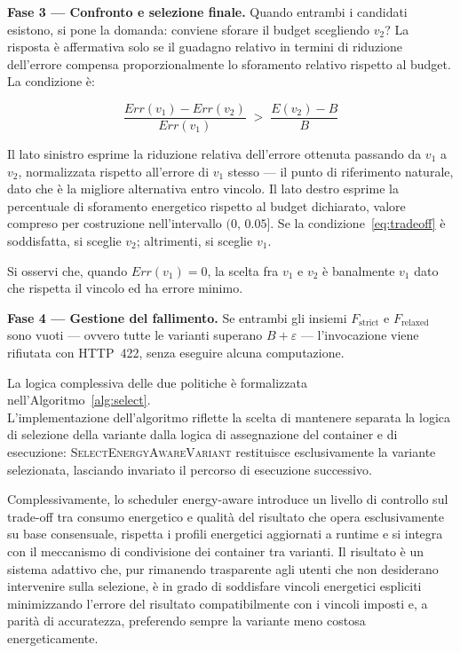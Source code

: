 \medskip
\noindent\textbf{Fase 3 — Confronto e selezione finale.}
Quando entrambi i candidati esistono, si pone la domanda: conviene
sforare il budget scegliendo $v_2$? La risposta è affermativa solo se il
guadagno relativo in termini di riduzione dell'errore compensa proporzionalmente
lo sforamento relativo rispetto al budget. La condizione è:

\begin{equation}
  \frac{\mathit{Err}(v_1) - \mathit{Err}(v_2)}{\mathit{Err}(v_1)}
  \;>\;
  \frac{E(v_2) - B}{B}
  \label{eq:tradeoff}
\end{equation}

Il lato sinistro esprime la riduzione relativa dell'errore ottenuta
passando da $v_1$ a $v_2$, normalizzata rispetto all'errore di $v_1$
stesso — il punto di riferimento naturale, dato che è la migliore
alternativa entro vincolo. Il lato destro esprime la percentuale di
sforamento energetico rispetto al budget dichiarato, valore compreso per
costruzione nell'intervallo $(0,\, 0.05]$.
Se la condizione~\eqref{eq:tradeoff} è soddisfatta, si sceglie $v_2$; altrimenti,
 si sceglie $v_1$.

Si osservi che, quando $\mathit{Err}(v_1) = 0$, la scelta fra $v_1$ e $v_2$ è banalmente $v_1$
dato che rispetta il vincolo ed ha errore minimo.

\medskip
\noindent\textbf{Fase 4 — Gestione del fallimento.}
Se entrambi gli insiemi $F_{\text{strict}}$ e $F_{\text{relaxed}}$ sono
vuoti — ovvero tutte le varianti superano $B + \varepsilon$ —
l'invocazione viene rifiutata con HTTP~422, senza eseguire alcuna
computazione.

La logica complessiva delle due politiche è formalizzata
nell'Algoritmo~\ref{alg:select}.\\
L'implementazione dell'algoritmo riflette la scelta di mantenere separata
la logica di selezione della variante dalla logica di assegnazione del
container e di esecuzione: \textsc{SelectEnergyAwareVariant} restituisce
esclusivamente la variante selezionata, lasciando invariato il percorso di
esecuzione successivo.

Complessivamente, lo scheduler energy-aware introduce un livello di controllo sul trade-off tra consumo energetico e qualità del risultato che opera esclusivamente su base consensuale, rispetta i profili energetici aggiornati a runtime e si integra con il meccanismo di condivisione dei container tra varianti. Il risultato è un sistema adattivo che, pur rimanendo trasparente agli utenti che non desiderano intervenire sulla selezione, è in grado di soddisfare vincoli energetici espliciti minimizzando l'errore del risultato compatibilmente con i vincoli imposti e, a parità di accuratezza, preferendo sempre la variante meno costosa energeticamente.

